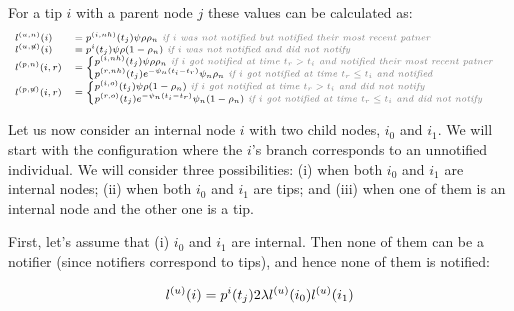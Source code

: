 \documentclass[a4paper,10pt]{article}
\begin{document}
For a tip $i$ with a parent node $j$ these values can be calculated as:
\begin{equation}
\scriptsize
\begin{array}{ll}
l^{(u,n)}(i) &= p^{(i,nh)}(t_j)\psi\rho
\rho_{n} \textit{\color{gray} ~if $i$ was not notified but notified their most recent patner}\\
l^{(u,\not{n})}(i) &= p^{i}(t_j)\psi\rho (1-\rho_{n}) \textit{\color{gray} ~if $i$ was not notified and did not notify}\\
l^{(p,n)}(i,r) &= \begin{cases}
p^{(i, nh)}(t_j)\psi\rho\rho_{n} \textit{\color{gray} ~if $i$ got notified at time $t_r > t_i$ and notified their most recent patner}\\
p^{(r, nh)}(t_j) e^{- \psi_n (t_i - t_r)} \psi_n \rho_{n} \textit{\color{gray} ~if $i$ got notified at time $t_r \leq t_i$ and notified}
\end{cases}\\
l^{(p,\not{n})}(i,r) &= \begin{cases}
p^{(i, o)}(t_j)\psi\rho(1 - \rho_{n}) \textit{\color{gray} ~if $i$ got notified at time $t_r > t_i$ and did not notify}\\
p^{(r, o)}(t_j) e^{- \psi_n (t_i - t_r)} \psi_n (1-\rho_{n}) \textit{\color{gray} ~if $i$ got notified at time $t_r \leq t_i$ and did not notify}
\end{cases}\\
\end{array}
\label{eq:tip}
\end{equation}

Let us now consider an internal node $i$ with two child nodes, $i_0$ and $i_1$. We will start with the configuration where the $i$'s branch corresponds to an unnotified individual. We will consider three possibilities: (i) when both $i_0$ and $i_1$ are internal nodes; (ii) when both $i_0$ and $i_1$ are tips; and (iii) when one of them is an internal node and the other one is a tip.


First, let's assume that (i) $i_0$ and $i_1$ are internal. Then none of them can be a notifier (since notifiers correspond to tips), and hence none of them is notified:

\begin{equation}
\scriptsize
l^{(u)}(i) = p^{i}(t_j) 2\lambda l^{(u)}(i_0)l^{(u)}(i_1) \label{eq:lu-int-int}
\end{equation}
\end{document}
